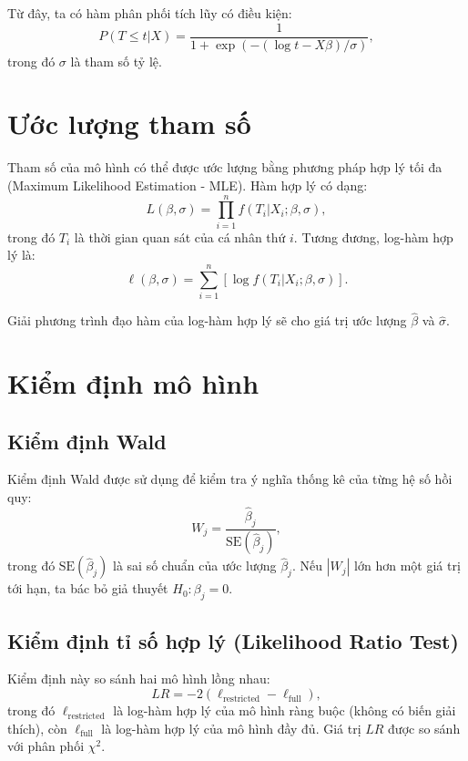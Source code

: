 Từ đây, ta có hàm phân phối tích lũy có điều kiện:
\begin{equation}
    P(T \leq t | X) = \frac{1}{1 + \exp(- (\log t - X\beta) / \sigma)},
\end{equation}
trong đó $\sigma$ là tham số tỷ lệ.

\section{Ước lượng tham số}
Tham số của mô hình có thể được ước lượng bằng phương pháp hợp lý tối đa (Maximum Likelihood Estimation - MLE). Hàm hợp lý có dạng:
\begin{equation}
    L(\beta, \sigma) = \prod_{i=1}^{n} f(T_i | X_i; \beta, \sigma),
\end{equation}
trong đó $T_i$ là thời gian quan sát của cá nhân thứ $i$. Tương đương, log-hàm hợp lý là:
\begin{equation}
    \ell(\beta, \sigma) = \sum_{i=1}^{n} \left[ \log f(T_i | X_i; \beta, \sigma) \right].
\end{equation}

Giải phương trình đạo hàm của log-hàm hợp lý sẽ cho giá trị ước lượng $\hat{\beta}$ và $\hat{\sigma}$.

\section{Kiểm định mô hình}
\subsection{Kiểm định Wald}
Kiểm định Wald được sử dụng để kiểm tra ý nghĩa thống kê của từng hệ số hồi quy:
\begin{equation}
    W_j = \frac{\hat{\beta}_j}{\text{SE}(\hat{\beta}_j)},
\end{equation}
trong đó $\text{SE}(\hat{\beta}_j)$ là sai số chuẩn của ước lượng $\hat{\beta}_j$. Nếu $|W_j|$ lớn hơn một giá trị tới hạn, ta bác bỏ giả thuyết $H_0: \beta_j = 0$.

\subsection{Kiểm định tỉ số hợp lý (Likelihood Ratio Test)}
Kiểm định này so sánh hai mô hình lồng nhau:
\begin{equation}
    LR = -2 (\ell_{\text{restricted}} - \ell_{\text{full}}),
\end{equation}
trong đó $\ell_{\text{restricted}}$ là log-hàm hợp lý của mô hình ràng buộc (không có biến giải thích), còn $\ell_{\text{full}}$ là log-hàm hợp lý của mô hình đầy đủ. Giá trị $LR$ được so sánh với phân phối $\chi^2$.

